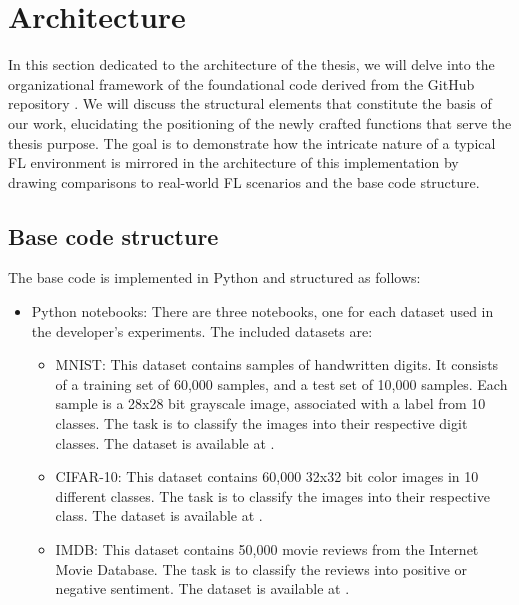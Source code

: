 \section{Architecture}
In this section dedicated to the architecture of the thesis, we will delve into the organizational framework of the foundational code derived from the GitHub repository \cite{LFighter_code}. We will discuss the structural elements that constitute the basis of our work, elucidating the positioning of the newly crafted functions that serve the thesis purpose. The goal is to demonstrate how the intricate nature of a typical FL environment is mirrored in the architecture of this implementation by drawing comparisons to real-world FL scenarios and the base code structure.

\subsection{Base code structure}
The base code is implemented in Python and structured as follows:
\begin{itemize}
        \item Python notebooks: There are three notebooks, one for each dataset used in the developer's experiments. The included datasets are:
        \begin{itemize}
                \item MNIST: This dataset contains samples of handwritten digits. It consists of a training set of 60,000 samples, and a test set of 10,000 samples. Each sample is a 28x28 bit grayscale image, associated with a label from 10 classes. The task is to classify the images into their respective digit classes. The dataset is available at \cite{MNIST}.
                \item CIFAR-10: This dataset contains 60,000 32x32 bit color images in 10 different classes. The task is to classify the images into their respective class. The dataset is available at \cite{CIFAR10}.
                \item IMDB: This dataset contains 50,000 movie reviews from the Internet Movie Database. The task is to classify the reviews into positive or negative sentiment. The dataset is available at \cite{IMDB}.
        \end{itemize}
\end{itemize}







